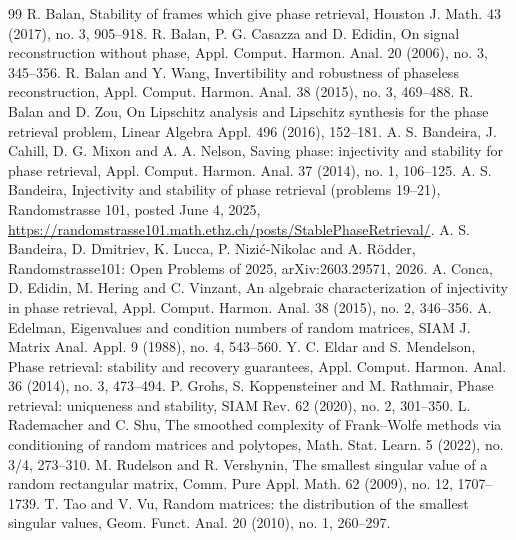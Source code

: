 \documentclass[10pt,a4paper]{amsart}
\begin{document}
\begin{thebibliography}{99}
 R. Balan, Stability of frames which give phase retrieval, Houston J. Math. 43 (2017), no. 3, 905--918.
 R. Balan, P. G. Casazza and D. Edidin, On signal reconstruction without phase, Appl. Comput. Harmon. Anal. 20 (2006), no. 3, 345--356.
 R. Balan and Y. Wang, Invertibility and robustness of phaseless reconstruction, Appl. Comput. Harmon. Anal. 38 (2015), no. 3, 469--488.
 R. Balan and D. Zou, On Lipschitz analysis and Lipschitz synthesis for the phase retrieval problem, Linear Algebra Appl. 496 (2016), 152--181.
 A. S. Bandeira, J. Cahill, D. G. Mixon and A. A. Nelson, Saving phase: injectivity and stability for phase retrieval, Appl. Comput. Harmon. Anal. 37 (2014), no. 1, 106--125.
 A. S. Bandeira, Injectivity and stability of phase retrieval (problems 19--21), Randomstrasse 101, posted June 4, 2025, \url{https://randomstrasse101.math.ethz.ch/posts/StablePhaseRetrieval/}.
 A. S. Bandeira, D. Dmitriev, K. Lucca, P. Nizi\'c-Nikolac and A. R\"odder, Randomstrasse101: Open Problems of 2025, arXiv:2603.29571, 2026.
 A. Conca, D. Edidin, M. Hering and C. Vinzant, An algebraic characterization of injectivity in phase retrieval, Appl. Comput. Harmon. Anal. 38 (2015), no. 2, 346--356.
 A. Edelman, Eigenvalues and condition numbers of random matrices, SIAM J. Matrix Anal. Appl. 9 (1988), no. 4, 543--560.
 Y. C. Eldar and S. Mendelson, Phase retrieval: stability and recovery guarantees, Appl. Comput. Harmon. Anal. 36 (2014), no. 3, 473--494.
 P. Grohs, S. Koppensteiner and M. Rathmair, Phase retrieval: uniqueness and stability, SIAM Rev. 62 (2020), no. 2, 301--350.
 L. Rademacher and C. Shu, The smoothed complexity of Frank--Wolfe methods via conditioning of random matrices and polytopes, Math. Stat. Learn. 5 (2022), no. 3/4, 273--310.
 M. Rudelson and R. Vershynin, The smallest singular value of a random rectangular matrix, Comm. Pure Appl. Math. 62 (2009), no. 12, 1707--1739.
 T. Tao and V. Vu, Random matrices: the distribution of the smallest singular values, Geom. Funct. Anal. 20 (2010), no. 1, 260--297.
\end{thebibliography}
\end{document}
